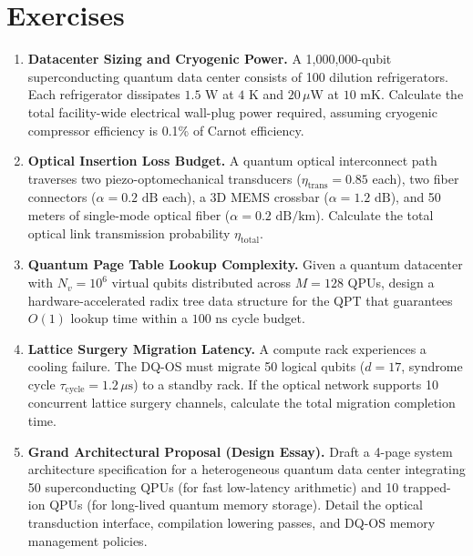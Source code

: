 
\section*{Exercises}

\begin{enumerate}[label=\textbf{15.\arabic*.}]
    \item \textbf{Datacenter Sizing and Cryogenic Power.} A 1,000,000-qubit superconducting quantum data center consists of 100 dilution refrigerators. Each refrigerator dissipates $1.5\text{ W}$ at $4\text{ K}$ and $20\,\mu\text{W}$ at $10\text{ mK}$. Calculate the total facility-wide electrical wall-plug power required, assuming cryogenic compressor efficiency is 0.1\% of Carnot efficiency.
    
    \item \textbf{Optical Insertion Loss Budget.} A quantum optical interconnect path traverses two piezo-optomechanical transducers ($\eta_{\text{trans}} = 0.85$ each), two fiber connectors ($\alpha = 0.2\text{ dB}$ each), a 3D MEMS crossbar ($\alpha = 1.2\text{ dB}$), and 50 meters of single-mode optical fiber ($\alpha = 0.2\text{ dB/km}$). Calculate the total optical link transmission probability $\eta_{\text{total}}$.
    
    \item \textbf{Quantum Page Table Lookup Complexity.} Given a quantum datacenter with $N_v = 10^6$ virtual qubits distributed across $M = 128$ QPUs, design a hardware-accelerated radix tree data structure for the QPT that guarantees $O(1)$ lookup time within a $100\text{ ns}$ cycle budget.
    
    \item \textbf{Lattice Surgery Migration Latency.} A compute rack experiences a cooling failure. The DQ-OS must migrate 50 logical qubits ($d=17$, syndrome cycle $\tau_{\text{cycle}} = 1.2\,\mu\text{s}$) to a standby rack. If the optical network supports 10 concurrent lattice surgery channels, calculate the total migration completion time.
    
    \item \textbf{Grand Architectural Proposal (Design Essay).} Draft a 4-page system architecture specification for a heterogeneous quantum data center integrating 50 superconducting QPUs (for fast low-latency arithmetic) and 10 trapped-ion QPUs (for long-lived quantum memory storage). Detail the optical transduction interface, compilation lowering passes, and DQ-OS memory management policies.
\end{enumerate}
